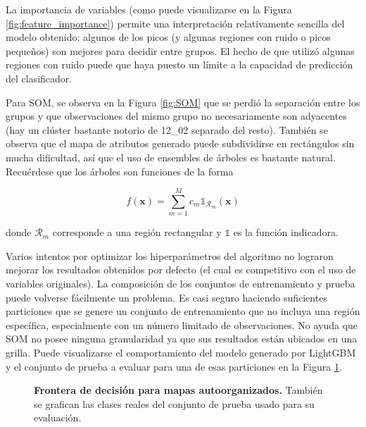 \documentclass[12pt]{article}
\begin{document}
La importancia de variables (como puede visualizarse en la Figura \ref{fig:feature_importance}) permite una interpretación relativamente sencilla del modelo obtenido: algunos de los picos (y algunas regiones con ruido o picos pequeños) son mejores para decidir entre grupos. El hecho de que utilizó algunas regiones con ruido puede que haya puesto un límite a la capacidad de predicción del clasificador.


Para SOM, se observa en la Figura \ref{fig:SOM} que se perdió la separación entre los grupos y que observaciones del mismo grupo no necesariamente son adyacentes (hay un clúster bastante notorio de 12\_02 separado del resto). También se observa que el mapa de atributos generado puede subdividirse en rectángulos sin mucha dificultad, así que el uso de ensembles de árboles es bastante natural. Recuérdese que los árboles son funciones de la forma 

\begin{equation}
f(\mathbf{x}) = \sum_{m = 1}^M c_m \mathds{1}_{\mathcal{R}_m}(\mathbf{x})    
\end{equation} 

donde $\mathcal{R}_m$ corresponde a una región rectangular y $\mathds{1}$ es la función indicadora.

Varios intentos por optimizar los hiperparámetros del algoritmo no lograron mejorar los resultados obtenidos por defecto (el cual es competitivo con el uso de variables originales). La composición de los conjuntos de entrenamiento y prueba puede volverse fácilmente un problema. Es casi seguro haciendo suficientes particiones que se genere un conjunto de entrenamiento que no incluya una región específica, especialmente con un número limitado de observaciones. No ayuda que SOM no posee ninguna granularidad ya que sus resultados están ubicados en una grilla. Puede visualizarse el comportamiento del modelo generado por LightGBM y el conjunto de prueba a evaluar para una de esas particiones en la Figura \ref{fig:BoundarySOM}.

\begin{figure}[htbp]
    \centering
    
    \caption{\textbf{Frontera de decisión para mapas autoorganizados.} También se grafican las clases reales del conjunto de prueba usado para su evaluación.}
    \label{fig:BoundarySOM}
\end{figure}
\end{document}
